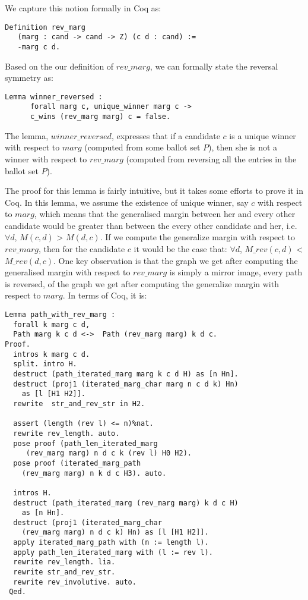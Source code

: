 We capture this notion formally in Coq as:

\begin{verbatim}
Definition rev_marg 
   (marg : cand -> cand -> Z) (c d : cand) :=
   -marg c d.
\end{verbatim}

Based on the our definition of $rev\_marg$, we can formally state the reversal symmetry as:
\begin{verbatim}
Lemma winner_reversed :
      forall marg c, unique_winner marg c ->
      c_wins (rev_marg marg) c = false.
\end{verbatim}

The lemma, $winner\_reversed$, expresses that if a candidate $c$ is a unique winner 
with respect to $marg$ (computed from some ballot set $P$), then she is not a winner with respect 
to $rev\_marg$ (computed from reversing all the entries in the ballot set $P$).


The proof for this lemma is fairly intuitive, but it takes some efforts to prove it in Coq. 
In this lemma, we assume the 
existence of unique winner, say $c$ with respect to $marg$, which means that the generalised
margin between her and every other candidate would be greater than 
between the every other candidate and her, i.e.  $\forall d$, $M (c, d)$ > $M (d, c)$. 
If we compute the generalize margin with respect to $rev\_marg$, then 
for the candidate $c$ it would be the case that:  
$\forall d$, $M\_rev (c, d)$ <  $M\_rev (d, c)$. 
One key observation is that the graph we get after computing the generalised margin with respect to $rev\_marg$ is 
simply a mirror image, every path is reversed, of the graph we get after computing the generalize margin with respect to $marg$. 
In terms of Coq, it is:
\begin{verbatim}
Lemma path_with_rev_marg :
  forall k marg c d,
  Path marg k c d <->  Path (rev_marg marg) k d c.
Proof.
  intros k marg c d.
  split. intro H. 
  destruct (path_iterated_marg marg k c d H) as [n Hn].
  destruct (proj1 (iterated_marg_char marg n c d k) Hn) 
    as [l [H1 H2]].
  rewrite  str_and_rev_str in H2.

  assert (length (rev l) <= n)%nat.
  rewrite rev_length. auto.
  pose proof (path_len_iterated_marg 
     (rev_marg marg) n d c k (rev l) H0 H2).
  pose proof (iterated_marg_path 
    (rev_marg marg) n k d c H3). auto. 
      
  intros H. 
  destruct (path_iterated_marg (rev_marg marg) k d c H) 
    as [n Hn].  
  destruct (proj1 (iterated_marg_char 
    (rev_marg marg) n d c k) Hn) as [l [H1 H2]].
  apply iterated_marg_path with (n := length l).
  apply path_len_iterated_marg with (l := rev l).
  rewrite rev_length. lia. 
  rewrite str_and_rev_str.
  rewrite rev_involutive. auto.
 Qed.
    
\end{verbatim}

